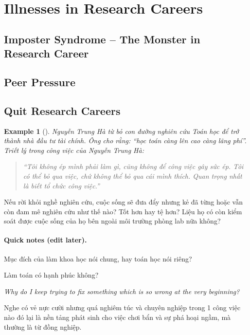 \documentclass{article}
\numberwithin{equation}{section}
\newtheorem{example}{Example}[section]
\begin{document}
\section{Illnesses in Research Careers}

\subsection{Imposter Syndrome -- The Monster in Research Career}

\subsection{Peer Pressure}

\subsection{Quit Research Careers}

\begin{example}[\cite{VNE/NTH}]
	Nguyễn Trung Hà từ bỏ con đường nghiên cứu Toán học để trở thành nhà đầu tư tài chính. Ông cho rằng: ``học toán càng lên cao càng lãng phí''. Triết lý trong công việc của Nguyễn Trung Hà:
	\begin{quotation}
		``Tôi không ép mình phải làm gì, cũng không để công việc gây sức ép. Tôi có thể bỏ qua việc, chứ không thể bỏ qua cái mình thích. Quan trọng nhất là biết tổ chức công việc.''
	\end{quotation}
	
\end{example}
Nếu rời khỏi nghề nghiên cứu, cuộc sống sẽ đưa đẩy nhưng kẻ đã từng hoặc vẫn còn đam mê nghiên cứu như thế nào? Tốt hơn hay tệ hơn? Liệu họ có còn kiểm soát được cuộc sống của họ bên ngoài môi trường phòng lab nữa không?


\paragraph{Quick notes (edit later).}
Mục đích của làm khoa học nói chung, hay toán học nói riêng?

Làm toán có hạnh phúc không?

\textit{Why do I keep trying to fix something which is so wrong at the very beginning?}

Nghe có vẻ nực cười nhưng quá nghiêm túc và chuyên nghiệp trong 1 công việc nào đó lại là nền tảng phát sinh cho việc chơi bẩn và sự phá hoại ngầm, mà thường là từ đồng nghiệp.
\end{document}
